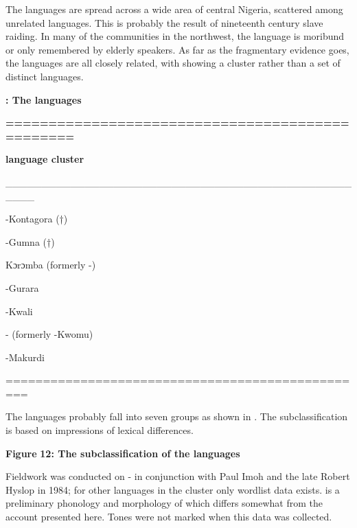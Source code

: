 \documentclass[output=paper]{langsci/langscibook}
\begin{document}
The  languages are spread across a wide area of central Nigeria, scattered among unrelated languages. This is probably the result of nineteenth century slave raiding. In many of the communities in the northwest, the language is moribund or only remembered by elderly speakers. As far as the fragmentary evidence goes, the  languages are all closely related, with  showing a cluster rather than a set of distinct languages. 

\textbf{: The  languages}

\textbf{================================================}

     \textbf{ language cluster}

\_\_\_\_\_\_\_\_\_\_\_\_\_\_\_\_\_\_\_\_\_\_\_\_\_\_\_\_\_\_\_\_\_\_\_\_\_\_\_\_\_\_\_\_\_\_\_\_\_\_\_\_

-Kontagora (†)

 -Gumna (†)

 Kɔrɔmba (formerly -)

 -Gurara

 -Kwali

 - (formerly -Kwomu)

 -Makurdi

=================================================

The  languages probably fall into seven groups as shown in . The subclassification is based on impressions of lexical differences. 


  
 \textbf{ {Figure} }\textbf{{12: The subclassification of the  languages}}


Fieldwork was conducted on - in conjunction with Paul Imoh and the late Robert Hyslop in 1984; for other languages in the cluster only wordlist data exists. \citet{Imoh2002} is a preliminary phonology and morphology of  which differs somewhat from the account presented here. Tones were not marked when this data was collected.
\end{document}

